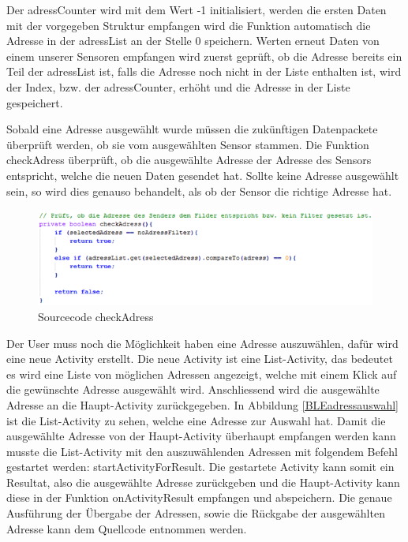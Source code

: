 Der adressCounter wird mit dem Wert -1 initialisiert, werden die ersten Daten mit der vorgegeben Struktur empfangen wird die Funktion automatisch die Adresse in der adressList an der Stelle 0 speichern. Werten erneut Daten von einem unserer Sensoren empfangen wird zuerst geprüft, ob die Adresse bereits ein Teil der adressList ist, falls die Adresse noch nicht in der Liste enthalten ist, wird der Index, bzw. der adressCounter, erhöht und die Adresse in der Liste gespeichert.

Sobald eine Adresse ausgewählt wurde müssen die zukünftigen Datenpackete überprüft werden, ob sie vom ausgewählten Sensor stammen. Die Funktion checkAdress überprüft, ob die ausgewählte Adresse der Adresse des Sensors entspricht, welche die neuen Daten gesendet hat. Sollte keine Adresse ausgewählt sein, so wird dies genauso behandelt, als ob der Sensor die richtige Adresse hat.

\begin{figure}[ht]
    \includegraphics{3Vorgehen/imag/app_checkAdress.png}
    \caption{Sourcecode checkAdress}
	\label{app_checkAdress} 
\end{figure}

Der User muss noch die Möglichkeit haben eine Adresse auszuwählen, dafür wird eine neue Activity erstellt. Die neue Activity ist eine List-Activity, das bedeutet es wird eine Liste von möglichen Adressen angezeigt, welche mit einem Klick auf die gewünschte Adresse ausgewählt wird. Anschliessend wird die ausgewählte Adresse an die Haupt-Activity zurückgegeben. In Abbildung \ref{BLEadressauswahl} ist die List-Activity zu sehen, welche eine Adresse zur Auswahl hat. Damit die ausgewählte Adresse von der Haupt-Activity überhaupt empfangen werden kann musste die List-Activity mit den auszuwählenden Adressen mit folgendem Befehl gestartet werden: startActivityForResult. Die gestartete Activity kann somit ein Resultat, also die ausgewählte Adresse zurückgeben und die Haupt-Activity kann diese in der Funktion onActivityResult empfangen und abspeichern. Die genaue Ausführung der Übergabe der Adressen, sowie die Rückgabe der ausgewählten Adresse kann dem Quellcode entnommen werden.

